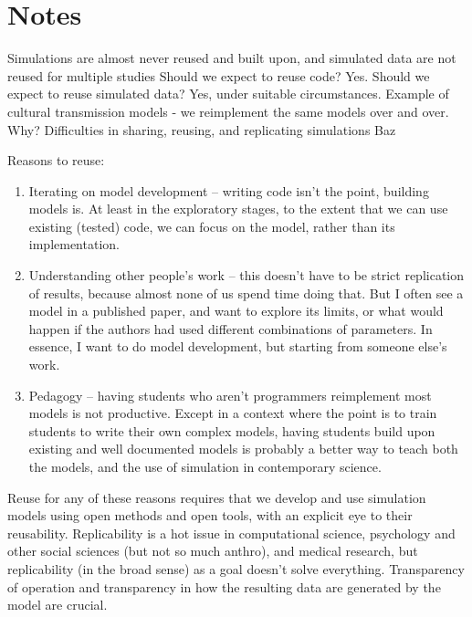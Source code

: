 \documentclass[preprint,times,authoryear,10pt]{elsarticle}
\begin{document}
\section{Notes}\label{notes}

\begin{outline}[enumerate]
    \1 Simulations are almost never reused and built upon, and simulated data are not reused for multiple studies
        \2 Should we expect to reuse code?  Yes.  
        \2 Should we expect to reuse simulated data?  Yes, under suitable circumstances.
        \2 Example of cultural transmission models - we reimplement the same models over and over.  Why?   
    \1 Difficulties in sharing, reusing, and replicating simulations
        \2 Baz
\end{outline}

Reasons to reuse:

\begin{enumerate}
\def\labelenumi{\arabic{enumi}.}
\itemsep1pt\parskip0pt
\item
  Iterating on model development -- writing code isn't the point,
  building models is. At least in the exploratory stages, to the extent
  that we can use existing (tested) code, we can focus on the model,
  rather than its implementation.\\
\item
  Understanding other people's work -- this doesn't have to be strict
  replication of results, because almost none of us spend time doing
  that. But I often see a model in a published paper, and want to
  explore its limits, or what would happen if the authors had used
  different combinations of parameters. In essence, I want to do model
  development, but starting from someone else's work.\\
\item
  Pedagogy -- having students who aren't programmers reimplement most
  models is not productive. Except in a context where the point is to
  train students to write their own complex models, having students
  build upon existing and well documented models is probably a better
  way to teach both the models, and the use of simulation in
  contemporary science.
\end{enumerate}

Reuse for any of these reasons requires that we develop and use
simulation models using open methods and open tools, with an explicit
eye to their reusability. Replicability is a hot issue in computational
science, psychology and other social sciences (but not so much anthro),
and medical research, but replicability (in the broad sense) as a goal
doesn't solve everything. Transparency of operation and transparency in
how the resulting data are generated by the model are crucial.
\end{document}
